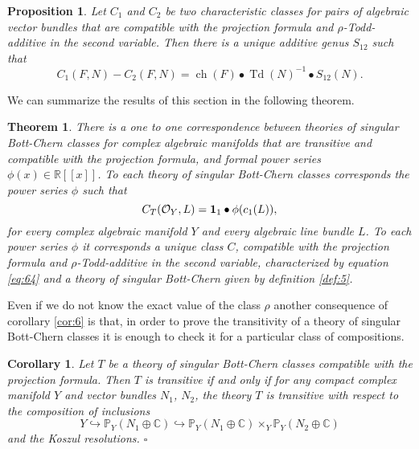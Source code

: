 \documentclass[10pt,twoside]{article}
\numberwithin{equation}{section}
\theoremstyle{plain}
\newtheorem{theorem}[equation]{Theorem}
\newtheorem{corollary}[equation]{Corollary}
\newtheorem{proposition}[equation]{Proposition}
\theoremstyle{definition}
\DeclareMathOperator{\Td}{Td}
\DeclareMathOperator{\ch}{ch}
\begin{document}
\begin{proposition}\label{prop:9}
  Let $C_{1}$ and $C_{2}$ be two characteristic classes for pairs of
  algebraic vector bundles that 
  are compatible with the
  projection formula and $\rho $-Todd-additive in the
  second  variable. Then there is a unique additive genus $S_{12}$ such that
  \begin{equation}\label{eq:39}
    C_{1}(F,N)-C_{2}(F,N)=\ch(F)\bullet \Td(N)^{-1}\bullet S_{12}(N).
  \end{equation}
\end{proposition}

We can summarize the results of this section in the following theorem.

\begin{theorem}\label{thm:7}
  There is a one to one correspondence between theories of singular
  Bott-Chern classes for complex algebraic manifolds that are
  transitive and compatible with the
  projection formula, and formal power series $\phi (x)\in
  \mathbb{R}[[x]]$. To each theory of singular Bott-Chern classes
  corresponds the power series $\phi $ such that
  \begin{equation}\label{eq:64}
    C_{T}(\mathcal{O}_{Y},L)={\bf 1}_{1}\bullet \phi (c_{1}(L)),
  \end{equation}
  for every complex algebraic manifold $Y$ and every algebraic line
  bundle $L$.
  To each power series $\phi $ it corresponds a unique class $C$,
  compatible with the
  projection formula and $\rho $-Todd-additive in
  the second  variable, characterized by equation \eqref{eq:64} and a
  theory of singular Bott-Chern given by definition \ref{def:5}. 
\end{theorem}

Even if we do not know the exact value of the class $\rho $ another
consequence of corollary \ref{cor:6} is that, in order to prove the
transitivity of a theory of singular Bott-Chern classes it is enough
to check it for a particular class of compositions.

\begin{corollary} \label{cor:8}
  Let $T$ be a theory of singular Bott-Chern classes compatible with
  the projection formula. Then $T$ is
  transitive if and only if for any compact complex manifold $Y$ and
  vector bundles $N_{1}$, $N_{2}$, the theory $T$ is transitive with
  respect to the composition of inclusions
  \begin{displaymath}
    Y\hookrightarrow \mathbb{P}_{Y}(N_{1}\oplus \mathbb{C})
    \hookrightarrow \mathbb{P}_{Y}(N_{1}\oplus \mathbb{C})
    \times_{Y}
    \mathbb{P}_{Y}(N_{2}\oplus \mathbb{C}) 
  \end{displaymath}
  and the Koszul resolutions. 
\hfill $\square$
\end{corollary}
\end{document}
